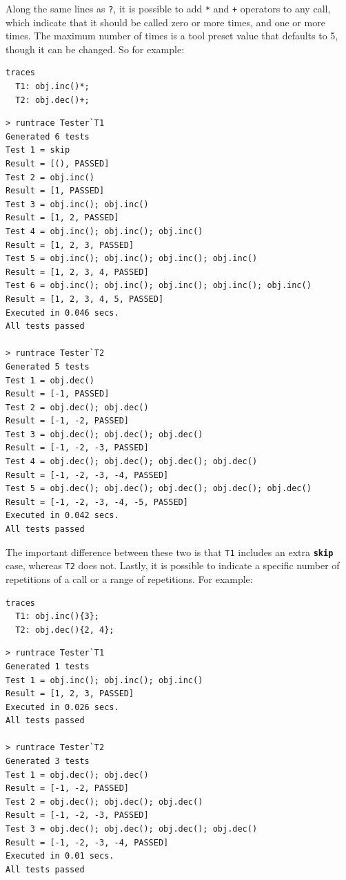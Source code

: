\documentclass{overturerepchap}
\begin{document}
Along the same lines as \texttt{?}, it is possible to add \texttt{*} and
\texttt{+} operators to any call, which indicate that it should be called zero
or more times, and one or more times. The maximum number of times is a tool preset
value that defaults to 5, though it can be changed. So for example:

\small
\begin{lstlisting}
traces
  T1: obj.inc()*;
  T2: obj.dec()+;
\end{lstlisting}

\lstset{style=tool,language=}
\begin{lstlisting}[escapechar=@]
> runtrace Tester`T1
Generated 6 tests
Test 1 = skip
Result = [(), PASSED]
Test 2 = obj.inc()
Result = [1, PASSED]
Test 3 = obj.inc(); obj.inc()
Result = [1, 2, PASSED]
Test 4 = obj.inc(); obj.inc(); obj.inc()
Result = [1, 2, 3, PASSED]
Test 5 = obj.inc(); obj.inc(); obj.inc(); obj.inc()
Result = [1, 2, 3, 4, PASSED]
Test 6 = obj.inc(); obj.inc(); obj.inc(); obj.inc(); obj.inc()
Result = [1, 2, 3, 4, 5, PASSED]
Executed in 0.046 secs. 
All tests passed

> runtrace Tester`T2
Generated 5 tests
Test 1 = obj.dec()
Result = [-1, PASSED]
Test 2 = obj.dec(); obj.dec()
Result = [-1, -2, PASSED]
Test 3 = obj.dec(); obj.dec(); obj.dec()
Result = [-1, -2, -3, PASSED]
Test 4 = obj.dec(); obj.dec(); obj.dec(); obj.dec()
Result = [-1, -2, -3, -4, PASSED]
Test 5 = obj.dec(); obj.dec(); obj.dec(); obj.dec(); obj.dec()
Result = [-1, -2, -3, -4, -5, PASSED]
Executed in 0.042 secs. 
All tests passed
\end{lstlisting}
\lstset{style=mystyle}
\lstset{language=VDM++}
\normalsize

\noindent The important difference between these two is that \texttt{T1} includes an extra
\texttt{\textbf{skip}} case, whereas \texttt{T2} does not.
Lastly, it is possible to indicate a specific number of repetitions of a call or
a range of repetitions. For example:

\small
\begin{lstlisting}
traces
  T1: obj.inc(){3};
  T2: obj.dec(){2, 4};
\end{lstlisting}

\lstset{style=tool,language=}
\begin{lstlisting}[escapechar=@]
> runtrace Tester`T1
Generated 1 tests
Test 1 = obj.inc(); obj.inc(); obj.inc()
Result = [1, 2, 3, PASSED]
Executed in 0.026 secs. 
All tests passed

> runtrace Tester`T2
Generated 3 tests
Test 1 = obj.dec(); obj.dec()
Result = [-1, -2, PASSED]
Test 2 = obj.dec(); obj.dec(); obj.dec()
Result = [-1, -2, -3, PASSED]
Test 3 = obj.dec(); obj.dec(); obj.dec(); obj.dec()
Result = [-1, -2, -3, -4, PASSED]
Executed in 0.01 secs. 
All tests passed
\end{lstlisting}
\lstset{style=mystyle}
\lstset{language=VDM++}
\normalsize
\end{document}
